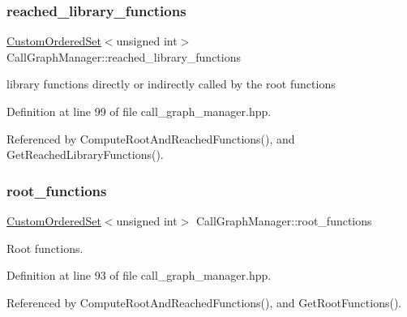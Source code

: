 \subsubsection{\texorpdfstring{reached\+\_\+library\+\_\+functions}{reached\_library\_functions}}
{\footnotesize\ttfamily \hyperlink{classCustomOrderedSet}{Custom\+Ordered\+Set}$<$unsigned int$>$ Call\+Graph\+Manager\+::reached\+\_\+library\+\_\+functions\hspace{0.3cm}{\ttfamily [private]}}



library functions directly or indirectly called by the root functions 



Definition at line 99 of file call\+\_\+graph\+\_\+manager.\+hpp.



Referenced by Compute\+Root\+And\+Reached\+Functions(), and Get\+Reached\+Library\+Functions().

\mbox{\label{classCallGraphManager_ad55ab572f629a824a3074728e2780640}} 
\subsubsection{\texorpdfstring{root\+\_\+functions}{root\_functions}}
{\footnotesize\ttfamily \hyperlink{classCustomOrderedSet}{Custom\+Ordered\+Set}$<$unsigned int$>$ Call\+Graph\+Manager\+::root\+\_\+functions\hspace{0.3cm}{\ttfamily [private]}}



Root functions. 



Definition at line 93 of file call\+\_\+graph\+\_\+manager.\+hpp.



Referenced by Compute\+Root\+And\+Reached\+Functions(), and Get\+Root\+Functions().

\mbox{\label{classCallGraphManager_a84c91d6640ac211ba1d4286d16dcd5d1}} 
